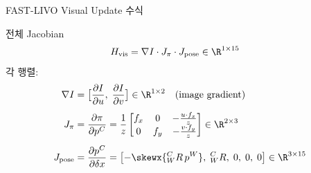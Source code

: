 \begin{frame}{FAST-LIVO Visual Update 수식}
  \begin{block}{전체 Jacobian}
    \begin{align*}
      H_{\text{vis}} &= \nabla I \cdot J_\pi \cdot J_{\text{pose}}
                      \in \R^{1\times15}
    \end{align*}
    각 행렬:
    \begin{align*}
      \nabla I &= \bigl[\frac{\partial I}{\partial u},\;
                         \frac{\partial I}{\partial v}\bigr]
                \in \R^{1\times2}
                \quad \text{(image gradient)}\\[4pt]
      J_\pi &= \frac{\partial \pi}{\partial p^C}
             = \frac{1}{z}\begin{bmatrix}f_x & 0 & -\frac{u \cdot f_x}{z}\\
                                          0 & f_y & -\frac{v \cdot f_y}{z}\end{bmatrix}
             \in \R^{2\times3}\\[4pt]
      J_{\text{pose}} &= \frac{\partial p^C}{\partial \delta x}
                      = \bigl[-\skewx{{}^C_WR\,p^W},\;
                               {}^C_WR,\; 0,\; 0,\; 0\bigr]
                      \in \R^{3\times15}
    \end{align*}
  \end{block}
\end{frame}

